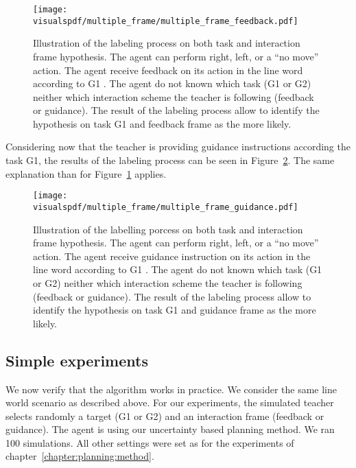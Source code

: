 \begin{figure}[!htbp]
\centering
\texttt{[image: \\visualspdf/multiple\_frame/multiple\_frame\_feedback.pdf]}
\caption{Illustration of the labeling process on both task and interaction frame hypothesis. The agent can perform right, left, or a ``no move'' action. The agent receive feedback on its action in the line word according to G1 . The agent do not known which task (G1 or G2) neither which interaction scheme the teacher is following (feedback or guidance). The result of the labeling process allow to identify the hypothesis on task G1 and feedback frame as the more likely.}
\label{fig:multipleframeexplainedfeedback}
\end{figure} 

\newpage

Considering now that the teacher is providing guidance instructions according the task G1, the results of the labeling process can be seen in Figure~\ref{fig:multipleframeexplainedguidance}. The same explanation than for Figure~\ref{fig:multipleframeexplainedfeedback} applies. 

\begin{figure}[!htbp]
\centering
\texttt{[image: \\visualspdf/multiple\_frame/multiple\_frame\_guidance.pdf]}
\caption{Illustration of the labelling porcess on both task and interaction frame hypothesis. The agent can perform right, left, or a ``no move'' action. The agent receive guidance instruction on its action in the line word according to G1 . The agent do not known which task (G1 or G2) neither which interaction scheme the teacher is following (feedback or guidance). The result of the labeling process allow to identify the hypothesis on task G1 and guidance frame as the more likely.}
\label{fig:multipleframeexplainedguidance}
\end{figure} 

\subsection{Simple experiments}

We now verify that the algorithm works in practice. We consider the same line world scenario as described above. For our experiments, the simulated teacher selects randomly a target (G1 or G2) and an interaction frame (feedback or guidance). The agent is using our uncertainty based planning method. We ran 100 simulations. All other settings were set as for the experiments of chapter~\ref{chapter:planning:method}.

